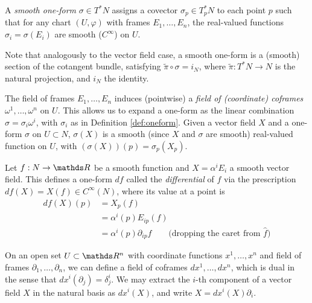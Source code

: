 \begin{defn}\label{def:oneform}
A \textit{smooth one-form} $\sigma\in T^*N$ assigns a covector $\sigma_p\in T_p^*N$ to each point $p$ such that for any chart $(U, \varphi)$ with frames $E_1, \dots, E_n$, the real-valued functions $\sigma_{i} = \sigma(E_i)$ are smooth ($C^{\infty}$) on $U$. 
\end{defn}

Note that analogously to the vector field case, a smooth one-form is a (smooth) section of the cotangent bundle, satisfying $\tilde \pi \circ \sigma = i_N$, where $\tilde \pi: T^*N \rightarrow N$ is the natural projection, and $i_N$ the identity. 

The field of frames $E_1, \dots, E_n$ induces (pointwise) a \textit{field of (coordinate) coframes} $\omega^1, \dots, \omega^n$ on $U$. This allows us to expand a one-form as the linear combination $\sigma = \sigma_i\omega^i$, with $\sigma_i$ as in Definition \ref{def:oneform}. Given a vector field $X$ and a one-form $\sigma$ on $U\subset N$, $\sigma(X)$ is a smooth (since $X$ and $\sigma$ are smooth) real-valued function on $U$, with $(\sigma(X))(p) = \sigma_p(X_p)$. 

 Let $f: N \rightarrow \R$ be a smooth function and $X = \alpha^i E_{i}$ a smooth vector field. This defines a one-form $df$ called the \textit{differential} of $f$ via the prescription $df(X) = X(f) \in C^{\infty}(N)$, where its value at a point is
\begin{equation}\label{eq:exact_differential_function}
 \begin{aligned}
df(X)(p) &={} X_p(f) \\&={} \alpha^{i}(p)E_{ip}(f) \\
&={} \alpha^i(p)\partial_{ip}f\qquad \text{(dropping the caret from $\hat f$)}
 \end{aligned}
 \end{equation}

On an open set $U\subset \R^n$ with coordinate functions $x^1, \dots, x^n$ and field of frames $\partial_1, \dots, \partial_n$, we can define a field of coframes $dx^1, \dots, dx^n$, which is dual in the sense that $dx^i(\partial_j) = \delta^i_j$. We may extract the $i$-th component of a vector field $X$ in the natural basis as $dx^i(X)$, and write $X = dx^i(X)\partial_i$. 

